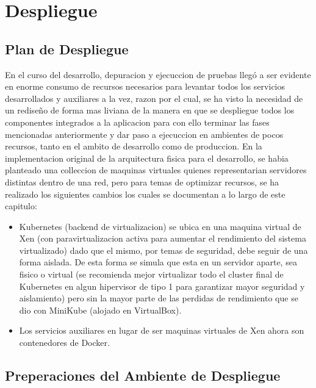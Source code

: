 
\chapter{Despliegue}
\label{capitulo6}

\section{Plan de Despliegue}
En el curso del desarrollo, depuracion y ejecuccion de pruebas llegó a ser evidente en enorme consumo de recursos necesarios para levantar todos los servicios desarrollados y auxiliares a la vez, razon por el cual, se ha visto la necesidad de un rediseño de forma mas liviana de la manera en que se despliegue todos los componentes integrados a la aplicacion para con ello terminar las fases mencionadas anteriormente y dar paso a ejecuccion en ambientes de pocos recursos, tanto en el ambito de desarrollo como de produccion. En la implementacion original de la arquitectura fisica para el desarrollo, se habia planteado una colleccion de maquinas virtuales quienes representarian servidores distintas dentro de una red, pero para temas de optimizar recursos, se ha realizado los siguientes cambios los cuales se documentan a lo largo de este capitulo:
\begin{itemize}
	\item Kubernetes (backend de virtualizacion) se ubica en una maquina virtual de Xen (con paravirtualizacion activa para aumentar el rendimiento del sistema virtualizado) dado que el mismo, por temas de seguridad, debe seguir de una forma aislada. De esta forma se simula que esta en un servidor aparte, sea fisico o virtual (se recomienda mejor virtualizar todo el cluster final de Kubernetes en algun hipervisor de tipo 1 para garantizar mayor seguridad y aislamiento) pero sin la mayor parte de las perdidas de rendimiento que se dio con MiniKube (alojado en VirtualBox).
    \item Los servicios auxiliares en lugar de ser maquinas virtuales de Xen ahora son contenedores de Docker.
    \
\end{itemize}

\section{Preperaciones del Ambiente de Despliegue}

